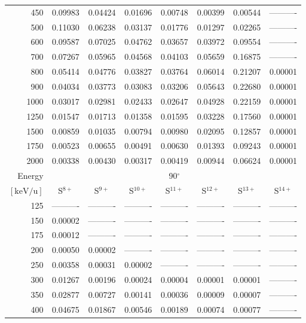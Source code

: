 \begin{table}[ht]
\begin{tabular}{r|c|c|c|c|c|c|c}
      450 & 0.09983 & 0.04424 & 0.01696 & 0.00748 & 0.00399 & 0.00544 & ---------- \\
      500 & 0.11030 & 0.06238 & 0.03137 & 0.01776 & 0.01297 & 0.02265 & ---------- \\
      600 & 0.09587 & 0.07025 & 0.04762 & 0.03657 & 0.03972 & 0.09554 & ---------- \\
      700 & 0.07267 & 0.05965 & 0.04568 & 0.04103 & 0.05659 & 0.16875 & ---------- \\
      800 & 0.05414 & 0.04776 & 0.03827 & 0.03764 & 0.06014 & 0.21207 & 0.00001 \\
      900 & 0.04034 & 0.03773 & 0.03083 & 0.03206 & 0.05643 & 0.22680 & 0.00001 \\
     1000 & 0.03017 & 0.02981 & 0.02433 & 0.02647 & 0.04928 & 0.22159 & 0.00001 \\
     1250 & 0.01547 & 0.01713 & 0.01358 & 0.01595 & 0.03228 & 0.17560 & 0.00001 \\
     1500 & 0.00859 & 0.01035 & 0.00794 & 0.00980 & 0.02095 & 0.12857 & 0.00001 \\
     1750 & 0.00523 & 0.00655 & 0.00491 & 0.00630 & 0.01393 & 0.09243 & 0.00001 \\
     2000 & 0.00338 & 0.00430 & 0.00317 & 0.00419 & 0.00944 & 0.06624 & 0.00001 \\ \cline{1-8}
    Energy & \multicolumn{7}{c}{90$^\circ$} \\ \cline{2-8}
    $\mathrm{[keV/u]}$ & S$^{8+}$ & S$^{9+}$ & S$^{10+}$ & S$^{11+}$ & S$^{12+}$ & S$^{13+}$ & S$^{14+}$ \\ \cline{1-8}
      125 & ---------- & ---------- & ---------- & ---------- & ---------- & ---------- & ---------- \\
      150 & 0.00002 & ---------- & ---------- & ---------- & ---------- & ---------- & ---------- \\
      175 & 0.00012 & ---------- & ---------- & ---------- & ---------- & ---------- & ---------- \\
      200 & 0.00050 & 0.00002 & ---------- & ---------- & ---------- & ---------- & ---------- \\
      250 & 0.00358 & 0.00031 & 0.00002 & ---------- & ---------- & ---------- & ---------- \\
      300 & 0.01267 & 0.00196 & 0.00024 & 0.00004 & 0.00001 & 0.00001 & ---------- \\
      350 & 0.02877 & 0.00727 & 0.00141 & 0.00036 & 0.00009 & 0.00007 & ---------- \\
      400 & 0.04675 & 0.01867 & 0.00546 & 0.00189 & 0.00074 & 0.00077 & ---------- \\

\end{tabular}
\end{table}
